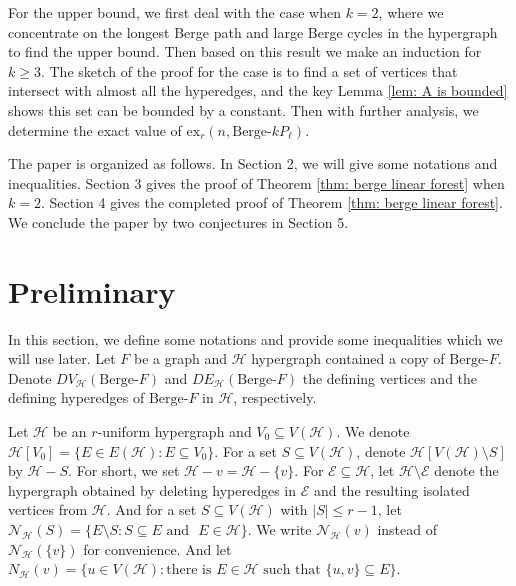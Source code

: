\documentclass[12pt]{article}%
\newcommand{\ber}{\text{Berge-}}
\newcommand{\mh}{\mathcal{H}}
\begin{document}
 For the upper bound, we first deal with the case when $k=2$, where we concentrate on the longest Berge path and large Berge cycles in the hypergraph to find the upper bound. Then based on this result we make an induction for $k\geq 3$. The sketch of the proof for the case is to find a set of vertices that intersect with almost all the hyperedges, and the key Lemma \ref{lem: A is bounded} shows this set can be bounded by a constant. Then with further analysis, we determine the exact value of $\mathrm{ex}_r(n,\ber k P_\ell)$.

The paper is organized as follows. In Section 2, we will give some notations and inequalities. Section 3 gives the proof of Theorem \ref{thm: berge linear forest} when $k=2$. Section 4 gives the  completed proof of  Theorem \ref{thm: berge linear forest}. We conclude the paper by two conjectures in Section 5.
\section{Preliminary}
In this section, we define some notations and provide some inequalities which we will use later.
Let  $F$ be a graph and  $\mh$  hypergraph contained a copy of $\ber F$. Denote $DV_\mh (\ber F)$  and $DE_\mh(\ber F)$ the defining vertices and  the defining hyperedges of  $\ber F$ in $\mh$, respectively.




Let $\mathcal{H}$ be an $r$-uniform hypergraph and $V_0\subseteq V(\mathcal{H})$. We denote $\mathcal{H}[V_0]=\{E\in E(\mathcal{H}): E\subseteq V_0\}$.
   For a set  $S\subseteq V(\mathcal{H})$,   denote $\mh[V(\mh)\setminus S]$ by $\mh-S$. For short, we set $\mh-v=\mh-\{v\}$. For $\mathcal{E}\subseteq \mathcal{H}$, let   $\mh\setminus \mathcal{E}$ denote the hypergraph obtained by deleting hyperedges in $\mathcal{E}$ and  the resulting isolated vertices from $\mh$. And for a set $S\subseteq V(\mh)$ with $|S|\leq r-1$, let $\mathcal{N}_\mh(S)=\{E\setminus S: S\subseteq E \text{~and ~} E\in \mh\}$. We write $\mathcal{N}_\mh(v)$ instead of $\mathcal{N}_\mh(\{v\})$ for convenience. And let $N_\mh(v)=\{u\in V(\mh):\mbox{there is~} E\in \mh \mbox{~such that~} \{u,v\}\subseteq E\}$.
\end{document}
